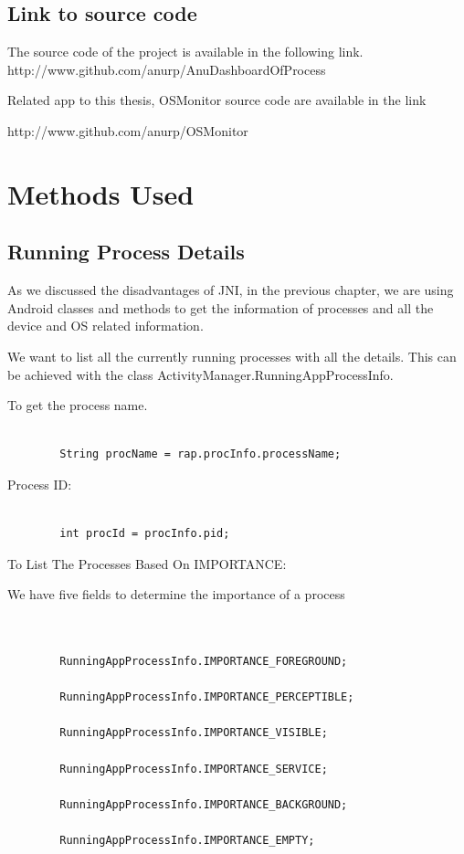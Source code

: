 \documentclass[12pt]{report}
\begin{document}
\section{Link to source code}

The source code of the project is available in the following link.
http://www.github.com/anurp/AnuDashboardOfProcess

Related app to this thesis, OSMonitor source code are available in the link

http://www.github.com/anurp/OSMonitor
\chapter{Methods Used}


\section{Running Process Details}
As we discussed the disadvantages of JNI, in the previous chapter, we are using Android classes and methods to get the information of processes and all the device and OS related information.

We want to list all the currently running processes with all the details. This can be achieved with the class ActivityManager.RunningAppProcessInfo.

To get the process name.
\begin{lstlisting}

        String procName = rap.procInfo.processName;
\end{lstlisting}


Process ID:

\begin{lstlisting}

        int procId = procInfo.pid;
\end{lstlisting}

To List The Processes Based On IMPORTANCE:

We have five fields to determine the importance of a process


\begin{lstlisting}


        RunningAppProcessInfo.IMPORTANCE_FOREGROUND; 

        RunningAppProcessInfo.IMPORTANCE_PERCEPTIBLE; 
       
        RunningAppProcessInfo.IMPORTANCE_VISIBLE; 

        RunningAppProcessInfo.IMPORTANCE_SERVICE; 
       
        RunningAppProcessInfo.IMPORTANCE_BACKGROUND; 

        RunningAppProcessInfo.IMPORTANCE_EMPTY; 

\end{lstlisting}
\end{document}
